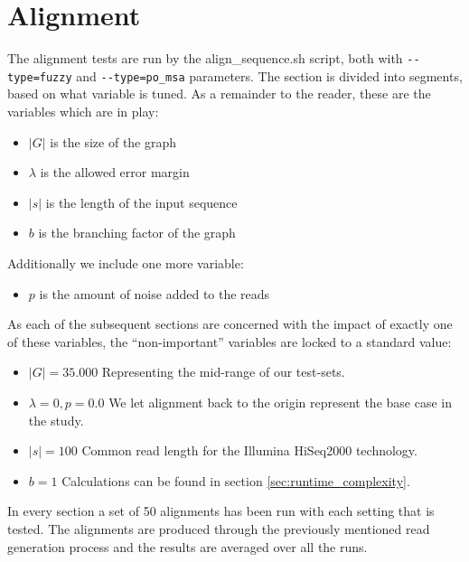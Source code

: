\documentclass[thesis.tex]{subfiles}
\begin{document}
\section{Alignment}
The alignment tests are run by the align\_sequence.sh script, both with \texttt{-{}-type=fuzzy} and \texttt{-{}-type=po\_msa} parameters. The section is divided into segments, based on what variable is tuned. As a remainder to the reader, these are the variables which are in play:
\begin{itemize}
  \item $|G|$ is the size of the graph
  \item $\lambda$ is the allowed error margin
  \item $|s|$ is the length of the input sequence
  \item $b$ is the branching factor of the graph
\end{itemize}
Additionally we include one more variable:
\begin{itemize}
  \item $p$ is the amount of noise added to the reads
\end{itemize}
As each of the subsequent sections are concerned with the impact of exactly one of these variables, the ``non-important'' variables are locked to a standard value:
\begin{itemize}
  \item \textbf{$|G|=35.000$} Representing the mid-range of our test-sets.
  \item \textbf{$\lambda=0, p=0.0$} We let alignment back to the origin represent the base case in the study.
  \item \textbf{$|s|=100$} Common read length for the Illumina HiSeq2000 technology.
  \item \textbf{$b=1$} Calculations can be found in section \ref{sec:runtime_complexity}.
\end{itemize}
In every section a set of 50 alignments has been run with each setting that is tested. The alignments are produced through the previously mentioned read generation process and the results are averaged over all the runs.
\end{document}
